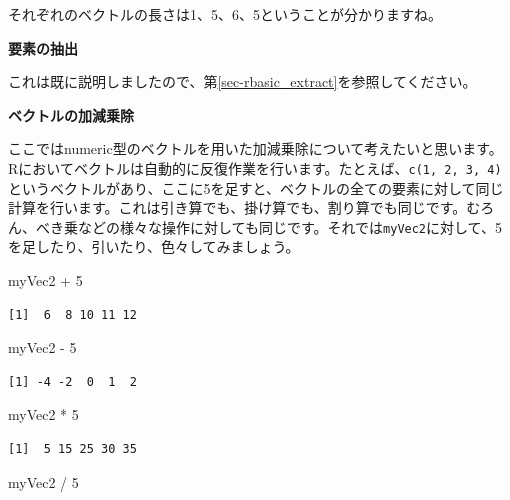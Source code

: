 \documentclass[
  a4paper,
  pandoc,
  ja=standard,
  jafont=haranoaji]{bxjsbook}
\newenvironment{Shaded}{\begin{snugshade}}{\end{snugshade}}
\newcommand{\DecValTok}[1]{\textcolor[rgb]{0.68,0.00,0.00}{#1}}
\newcommand{\NormalTok}[1]{\textcolor[rgb]{0.00,0.48,0.65}{#1}}
\newcommand{\SpecialCharTok}[1]{\textcolor[rgb]{0.37,0.37,0.37}{#1}}
\begin{document}
それぞれのベクトルの長さは1、5、6、5ということが分かりますね。

\textbf{要素の抽出}

これは既に説明しましたので、第\ref{sec-rbasic_extract}を参照してください。

\textbf{ベクトルの加減乗除}

ここではnumeric型のベクトルを用いた加減乗除について考えたいと思います。Rにおいてベクトルは自動的に反復作業を行います。たとえば、\texttt{c(1,\ 2,\ 3,\ 4)}というベクトルがあり、ここに5を足すと、ベクトルの全ての要素に対して同じ計算を行います。これは引き算でも、掛け算でも、割り算でも同じです。むろん、べき乗などの様々な操作に対しても同じです。それでは\texttt{myVec2}に対して、5を足したり、引いたり、色々してみましょう。

\begin{Shaded}
\begin{Highlighting}[numbers=left,,]
\NormalTok{myVec2 }\SpecialCharTok{+} \DecValTok{5}
\end{Highlighting}
\end{Shaded}

\begin{verbatim}
[1]  6  8 10 11 12
\end{verbatim}

\begin{Shaded}
\begin{Highlighting}[numbers=left,,]
\NormalTok{myVec2 }\SpecialCharTok{{-}} \DecValTok{5}
\end{Highlighting}
\end{Shaded}

\begin{verbatim}
[1] -4 -2  0  1  2
\end{verbatim}

\begin{Shaded}
\begin{Highlighting}[numbers=left,,]
\NormalTok{myVec2 }\SpecialCharTok{*} \DecValTok{5}
\end{Highlighting}
\end{Shaded}

\begin{verbatim}
[1]  5 15 25 30 35
\end{verbatim}

\begin{Shaded}
\begin{Highlighting}[numbers=left,,]
\NormalTok{myVec2 }\SpecialCharTok{/} \DecValTok{5}
\end{Highlighting}
\end{Shaded}
\end{document}
